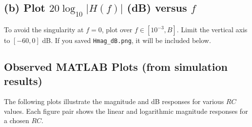 \documentclass[11pt]{article}
\begin{document}


\subsection*{(b) Plot \(20\log_{10}|H(f)|\) (dB) versus \(f\)}
To avoid the singularity at \(f=0\), plot over \(f\in[10^{-3}, B]\). Limit the vertical axis to \([-60,0]\) dB.
If you saved \texttt{Hmag\_dB.png}, it will be included below.


\subsection*{Observed MATLAB Plots (from simulation results)}
The following plots illustrate the magnitude and dB responses for various \(RC\) values. Each figure pair shows the linear and logarithmic magnitude responses for a chosen \(RC\).
\end{document}
